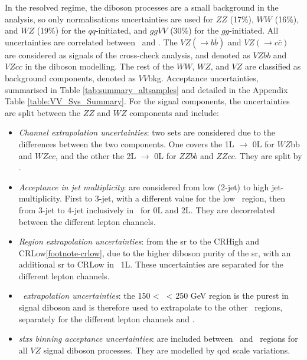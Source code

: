 In the resolved regime, the diboson processes are a small background in the analysis, so only normalisations uncertainties are used for $ZZ$ (17\%), $WW$ (16\%), and $WZ$ (19\%) for the $qq$-initiated, and $ggVV$ (30\%) for the $gg$-initiated. All uncertainties are correlated between \vhb\ and \vhc. The $VZ (\rightarrow b\bar{b})$ and $VZ (\rightarrow c\bar{c})$ are considered as signals of the cross-check analysis, and denoted as $VZbb$ and $VZcc$ in the diboson modelling. The rest of the $WW$, $WZ$, and $VZ$ are classified as background components, denoted as $VV$bkg. Acceptance uncertainties, summarised in Table \ref{tab:summary_altsamples} and detailed in the Appendix Table \ref{table:VV_Sys_Summary}. For the signal components, the uncertainties are split between the $ZZ$ and $WZ$ components and include:
\begin{itemize}[leftmargin=*]
    \item \textit{Channel extrapolation uncertainties}: two sets are considered due to the differences between the two components. One covers the 1L $\rightarrow$ 0L for $WZ$bb and $WZcc$, and the other the 2L $\rightarrow$ 0L for $ZZbb$ and $ZZcc$. They are split by \nj.
    \item \textit{Acceptance in jet multiplicity}: are considered from low (2-jet) to high jet-multiplicity. First to 3-jet, with a different value for the low \ptv\ region, then from 3-jet to 4-jet inclusively in \ptv\ for 0L and 2L. They are decorrelated between the different lepton channels.
    \item \textit{Region extrapolation uncertainties}: from the \gls{sr} to the CRHigh and CRLow\cref{footnote-crlow}, due to the higher diboson purity of the \gls{sr}, with an additional \gls{sr} to CRLow in \vhb\ 1L. These uncertainties are separated for the different lepton channels.
    \item \textit{\ptv\ extrapolation uncertainties}: the 150 < \ptv\ < 250 GeV region is the purest in signal diboson and is therefore used to extrapolate to the other \ptv\ regions, separately for the different lepton channels and \nj.
    \item \textit{\gls{stxs} binning acceptance uncertainties}: are included between \nj\ and \ptv\ regions for all $VZ$ signal diboson processes. They are modelled by \gls{qcd} scale variations. %
\end{itemize}

